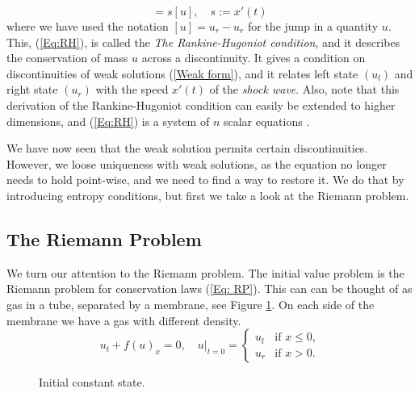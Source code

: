 \documentclass[10pt]{article}
\numberwithin{equation}{section}
\begin{document}
\begin{equation}
    [f] = s[u], \quad s := x'(t) 
    \label{Eq:RH}
\end{equation}
where we have used the notation $[u] = u_r - u_r$ for the jump in a quantity $u$. This, (\ref{Eq:RH}), is called the \textit{The Rankine-Hugoniot condition}, and it describes the conservation of mass $u$ across a discontinuity. It gives a condition on discontinuities of weak solutions (\ref{Weak form}), and it relates left state $(u_l)$ and right state $(u_r)$ with the speed $x'(t)$ of the \textit{shock wave}. Also, note that this derivation of the Rankine-Hugoniot condition can easily be extended to higher dimensions, and (\ref{Eq:RH}) is a system of $n$ scalar equations \cite{GaravelloMauro2006Tfon}.

We have now seen that the weak solution permits certain discontinuities. However, we loose uniqueness with weak solutions, as the equation no longer needs to hold point-wise, and we need to find a way to restore it. We do that by introducing entropy conditions, but first we take a look at the Riemann problem.

\subsection{The Riemann Problem}
We turn our attention to the Riemann problem. The initial value problem is the Riemann problem for conservation laws (\ref{Eq: RP}). This can can be thought of as gas in a tube, separated by a membrane, see Figure \ref{Fig:riemann_tube}. On each side of the membrane we have a gas with different density.
\begin{equation}
 u_t + f(u)_x = 0,  \quad u|_{t = 0 } = \begin{cases} u_l & \text{if $x \leq 0$,}\\ u_r & \text{if $x>0$.} 
 \label{Eq: RP}
 \end{cases}
\end{equation}
\begin{figure}
    \begin{center}
    \caption{Initial constant state.}
    \label{Fig:riemann_tube}
    \end{center}
\end{figure}
\end{document}
